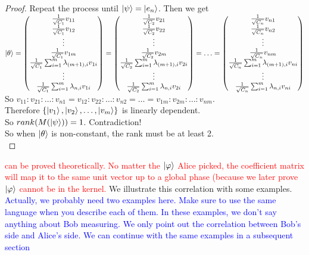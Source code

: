 \begin{proof}
Repeat the process until $\ket{\psi}=\ket{e_n}$. Then we get\\
$\ket{\theta}
=\begin{pmatrix}
\frac{1}{\sqrt{C_1}}v_{11}\\
\frac{1}{\sqrt{C_1}}v_{12}\\
\vdots\\
\frac{1}{\sqrt{C_1}}v_{1m}\\
\frac{1}{\sqrt{C_1}}\sum_{i=1}^m \lambda_{(m+1), i} v_{1i}\\
\vdots\\
\frac{1}{\sqrt{C_1}}\sum_{i=1}^m \lambda_{n, i} v_{1i}
\end{pmatrix}
=\begin{pmatrix}
\frac{1}{\sqrt{C_2}}v_{21}\\
\frac{1}{\sqrt{C_2}}v_{22}\\
\vdots\\
\frac{1}{\sqrt{C_2}}v_{2m}\\
\frac{1}{\sqrt{C_2}}\sum_{i=1}^m \lambda_{(m+1), i} v_{2i}\\
\vdots\\
\frac{1}{\sqrt{C_2}}\sum_{i=1}^m \lambda_{n, i} v_{2i}
\end{pmatrix}
=\hdots
=\begin{pmatrix}
\frac{1}{\sqrt{C_n}}v_{n1}\\
\frac{1}{\sqrt{C_n}}v_{n2}\\
\vdots\\
\frac{1}{\sqrt{C_n}}v_{nm}\\
\frac{1}{\sqrt{C_n}}\sum_{i=1}^m \lambda_{(m+1), i} v_{ni}\\
\vdots\\
\frac{1}{\sqrt{C_n}}\sum_{i=1}^m \lambda_{n, i} v_{ni}
\end{pmatrix}$\\
So $v_{11}:v_{21}:\hdots:v_{n1}=v_{12}:v_{22}:\hdots:v_{n2}=\hdots=v_{1m}:v_{2m}:\hdots:v_{nm}$.\\
Therefore $\{\ket{v_1}, \ket{v_2},\hdots, \ket{v_m}\}$ is linearly dependent.\\
So $rank(M(\ket{\psi})) = 1$. Contradiction!\\
So when $\ket{\theta}$ is non-constant, the rank must be at least 2.\\
\end{proof}

\textcolor{red}{can be proved theoretically. No matter the $\ket{\varphi}$ Alice picked, the coefficient matrix will map it to the same unit vector up to a global phase (because we later prove $\ket{\varphi}$ cannot be in the kernel.}
We illustrate this correlation with some examples.
\textcolor{blue}{Actually, we probably need two examples here.  Make sure to use the same language when you describe each of them.  In these examples, we don't say anything about Bob measuring.  We only point out the correlation between Bob's side and Alice's side.  We can continue with the same examples in a subsequent section}


